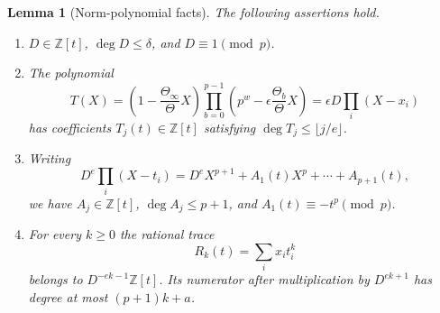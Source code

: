 \documentclass[11pt,a4paper]{article}
\newtheorem{lemma}[theorem]{Lemma}
\theoremstyle{definition}\newtheorem{definition}[theorem]{Definition}
\theoremstyle{remark}\newtheorem{remark}[theorem]{Remark}
\numberwithin{equation}{section}
\begin{document}
\begin{lemma}[Norm-polynomial facts]\label{E:lem:ell-norm}
The following assertions hold.
\begin{enumerate}
\item $D\in\mathbb Z[t]$, $\deg D\leq\delta$, and $D\equiv1\pmod p$.
\item The polynomial
\[
 T(X)=\left(1-\frac{\Theta_\infty}{\Theta}X\right)
       \prod_{b=0}^{p-1}\left(p^w-\epsilon\frac{\Theta_b}{\Theta}X\right)
      =\epsilon D\prod_i(X-x_i)
\]
has coefficients $T_j(t)\in\mathbb Z[t]$ satisfying
$\deg T_j\leq\lfloor j/e\rfloor$.
\item Writing
\[
 D^e\prod_i(X-t_i)=D^eX^{p+1}+A_1(t)X^p+\cdots+A_{p+1}(t),
\]
we have $A_j\in\mathbb Z[t]$, $\deg A_j\leq p+1$, and
$A_1(t)\equiv-t^p\pmod p$.
\item For every $k\geq0$ the rational trace
\[
 R_k(t)=\sum_i x_it_i^k
\]
belongs to $D^{-ek-1}\mathbb Z[t]$.  Its numerator after multiplication
by $D^{ek+1}$ has degree at most $(p+1)k+a$.
\end{enumerate}
\end{lemma}
\end{document}
